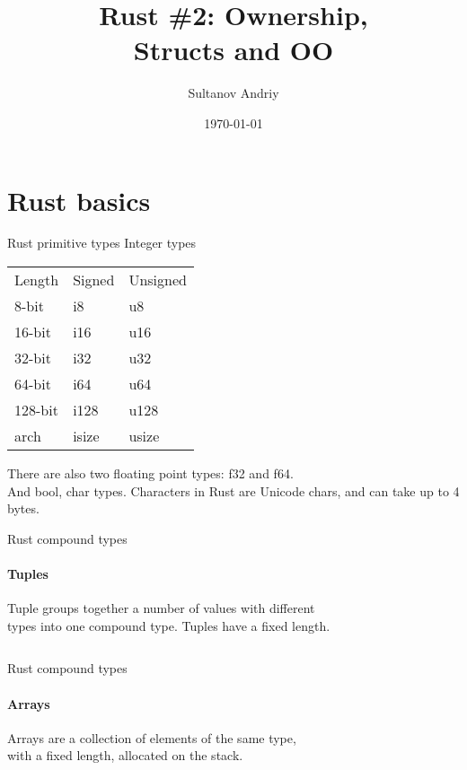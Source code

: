 \documentclass[usenames,dvipsnames,10pt,aspectratio=169]{beamer}
\title[Rust \#2]{Rust \#2: Ownership,\\ Structs and OO}
\date[\today]{\small\today}
\author[Sultanov Andriy]{Sultanov Andriy}
\institute{APPS@UCU}
\begin{document}
\begin{frame}
\titlepage
\end{frame}

\begin{frame}{\contentsname}
\tableofcontents
\end{frame}


\section{Rust basics}
\begin{frame}{Rust primitive types} 
\centering
\large
Integer types
\begin{table}[]
\begin{tabular}{lll}
Length  & Signed & Unsigned \\
8-bit   & i8     & u8       \\
16-bit  & i16    & u16      \\
32-bit  & i32    & u32      \\
64-bit  & i64    & u64      \\
128-bit & i128   & u128     \\
arch    & isize  & usize   
\end{tabular}
\end{table}
\vspace{0.5cm}
There are also two floating point types:
\textcolor{ucuyellow}{f32} and \textcolor{ucuyellow}{f64}.\\
And \textcolor{ucuyellow}{bool}, \textcolor{ucuyellow}{char} types.
Characters in Rust are Unicode chars, and can take up to 4 bytes.
\end{frame}

\begin{frame}{Rust compound types}
\framesubtitle{Tuples}
Tuple groups together a number of values with different\\
types into one compound type. Tuples have a fixed length.\\
\vspace{0.2cm}
\inputminted[fontsize=\large]{rust}{code/tuple.rs}
\vspace{0.5cm}
\end{frame}

\begin{frame}{Rust compound types}
\framesubtitle{Arrays}
Arrays are a collection of elements of the same type,\\
with a fixed length, allocated on the stack.
\vspace{0.2cm}
\inputminted[fontsize=\large]{rust}{code/array.rs}
\vspace{0.5cm}
\end{frame}
\end{document}

